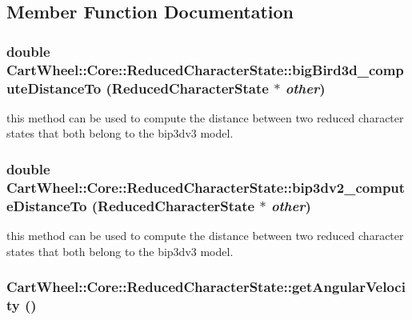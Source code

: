 \subsection{Member Function Documentation}
\hypertarget{classCartWheel_1_1Core_1_1ReducedCharacterState_aae04c76522e0b5f914651f9e12ef3395}{
\subsubsection[{bigBird3d\_\-computeDistanceTo}]{\setlength{\rightskip}{0pt plus 5cm}double CartWheel::Core::ReducedCharacterState::bigBird3d\_\-computeDistanceTo ({\bf ReducedCharacterState} $\ast$ {\em other})}}
\label{classCartWheel_1_1Core_1_1ReducedCharacterState_aae04c76522e0b5f914651f9e12ef3395}
this method can be used to compute the distance between two reduced character states that both belong to the bip3dv3 model. \hypertarget{classCartWheel_1_1Core_1_1ReducedCharacterState_abee0378601df6a0b6c35928cf8d5e052}{
\subsubsection[{bip3dv2\_\-computeDistanceTo}]{\setlength{\rightskip}{0pt plus 5cm}double CartWheel::Core::ReducedCharacterState::bip3dv2\_\-computeDistanceTo ({\bf ReducedCharacterState} $\ast$ {\em other})}}
\label{classCartWheel_1_1Core_1_1ReducedCharacterState_abee0378601df6a0b6c35928cf8d5e052}
this method can be used to compute the distance between two reduced character states that both belong to the bip3dv3 model. \hypertarget{classCartWheel_1_1Core_1_1ReducedCharacterState_a560c490811f41f52ca0432a09a1d986b}{
\subsubsection[{getAngularVelocity}]{ CartWheel::Core::ReducedCharacterState::getAngularVelocity ()}}
